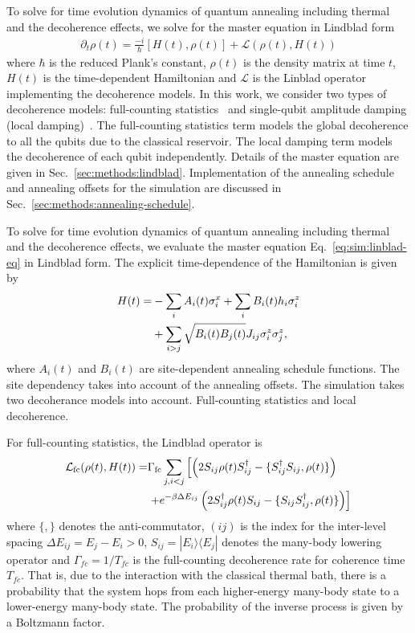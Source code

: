\documentclass[10pt]{iopart}
\begin{document}
To solve for time evolution dynamics of quantum annealing including thermal and the decoherence effects, we solve for the master equation in Lindblad form
\begin{align}
 \label{eq:sim:linblad-eq}
 \partial_t \rho (t) =  \frac{-i}{\hbar} [H(t) , \rho(t)] + \mathcal{L}(\rho(t), H(t))
\end{align}
where $\hbar$ is the reduced Plank's constant, $\rho (t)$ is the density matrix at time $t$, $H(t)$ is the time-dependent Hamiltonian and $\mathcal{L}$ is the Linblad operator implementing the decoherence models.
In this work, we consider two types of decoherence models: full-counting statistics~\cite{PhysRevE.90.022103,RevModPhys.81.1665} and single-qubit amplitude damping (local damping)~\cite{10.5555/1972505,preskill1998lecture}.
The full-counting statistics term models the global decoherence to all the qubits due to the classical reservoir.
The local damping term models the decoherence of each qubit independently.
Details of the master equation are given in Sec.~\ref{sec:methods:lindblad}.
Implementation of the annealing schedule and annealing offsets for the simulation are discussed in Sec.~\ref{sec:methods:annealing-schedule}.



To solve for time evolution dynamics of quantum annealing including thermal and the decoherence effects, we evaluate the master equation Eq.~\eqref{eq:sim:linblad-eq} in Lindblad form.
The explicit time-dependence of the Hamiltonian is given by
\begin{align}
 \label{eq:annealH}
 H(t)  = & - \sum_i  A_i(t)\sigma^x_i +\sum_i B_{i}(t) h_i \sigma^z_i \notag \\
 & + \sum_{i>j} \sqrt{B_{i}(t)B_{j}(t)} J_{ij} \sigma^z_i \sigma^z_j  ,
\end{align}
where $A_i(t)$ and $B_{i}(t)$ are site-dependent annealing schedule functions.
The site dependency takes into account of the annealing offsets.
The simulation takes two decoherance models into account.
Full-counting statistics and local decoherence.

For full-counting statistics, the Lindblad operator is
\begin{align}
\mathcal{L}_{\textrm{fc}}(\rho (t), H(t)) = & \Gamma_{\textrm{fc}} \sum_{j, i<j} \left[  \left(2 S_{ij} \rho(t) S_{ij}^\dagger - \{ S^\dagger_{ij} S_{ij}, \rho(t) \}\right) \notag \right.
\\
& \left. + e^{-\beta \Delta E_{ij}} \left(2 S_{ij}^\dagger \rho(t) S_{ij} - \{ S_{ij} S^\dagger_{ij}, \rho(t) \} \right)\right]
\end{align}
where $\{, \}$ denotes the anti-commutator, $(ij)$ is the index for the inter-level spacing $\Delta E_{ij}=E_j-E_i>0$,  $S_{ij}=|E_i \rangle \langle E_j|$ denotes the many-body lowering operator and $\Gamma_{fc} = 1/T_{fc}$ is the full-counting decoherence rate for coherence time $T_{fc}$.
That is, due to the interaction with the classical thermal bath, there is a probability that the system hops from each higher-energy many-body state to a lower-energy many-body state.
The probability of the inverse process is given by a Boltzmann factor.
\end{document}

